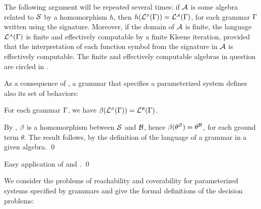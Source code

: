 The following argument will be repeated several times: if $\mathcal{A}$
is some \hrtext{} algebra related to $\mathcal{S}$ by a homomorphism
$h$, then $h(\mathcal{L}_{}^{\scriptscriptstyle{\mathcal{S}}}({\Gamma})) =
\mathcal{L}_{}^{\scriptscriptstyle{\mathcal{A}}}({\Gamma})$, for each grammar $\Gamma$ written
using the \hrtext{} signature. Moreover, if the domain of $\mathcal{A}$
is finite, the language $\mathcal{L}_{}^{\scriptscriptstyle{\mathcal{A}}}({\Gamma})$ is finite
and effectively computable by a finite Kleene iteration, provided that
the interpretation of each function symbol from the \hrtext{}
signature in $\mathcal{A}$ is effectively computable.  The finite and
effectively computable algebras in question are circled in
.

As a consequence of , a grammar that
specifies a parameterized system defines also its set of behaviors:

\begin{lemmaE}[][category=proofs]\label{prop:sys-beh}
  For each \hrtext{} grammar $\Gamma$, we have
  $\beta({\mathcal{L}_{}^{\scriptscriptstyle{\mathcal{S}}}({\Gamma})}) =
  \mathcal{L}_{}^{\scriptscriptstyle{\mathcal{B}}}({\Gamma})$.
\end{lemmaE}
\begin{proofE}
  By , $\beta$ is a homomorphism between
  $\mathcal{S}$ and $\mathcal{B}$, hence
  $\beta({\theta^{\mathcal{S}}})=\theta^{\mathcal{B}}$, for each ground term
  $\theta$. The result follows, by the definition of the language of a
  grammar in a given algebra. \qed
\end{proofE}
\begin{proofSketch}
  Easy application of 
  and .
  \qed
\end{proofSketch}

We consider the problems of reachability and coverability for
parameterized systems specified by grammars and give the formal
definitions of the decision problems:

